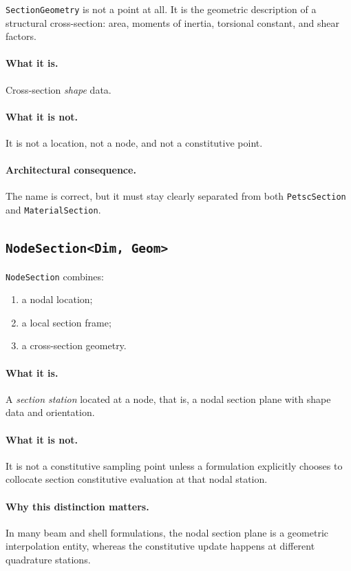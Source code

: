 \texttt{SectionGeometry} is not a point at all.  It is the geometric
description of a structural cross-section: area, moments of inertia, torsional
constant, and shear factors.

\paragraph{What it is.}
Cross-section \emph{shape} data.

\paragraph{What it is not.}
It is not a location, not a node, and not a constitutive point.

\paragraph{Architectural consequence.}
The name is correct, but it must stay clearly separated from both
\texttt{PetscSection} and \texttt{MaterialSection}.


\subsection{\texttt{NodeSection<Dim, Geom>}}

\texttt{NodeSection} combines:

\begin{enumerate}[nosep]
  \item a nodal location;
  \item a local section frame;
  \item a cross-section geometry.
\end{enumerate}

\paragraph{What it is.}
A \emph{section station} located at a node, that is, a nodal section plane with
shape data and orientation.

\paragraph{What it is not.}
It is not a constitutive sampling point unless a formulation explicitly chooses
to collocate section constitutive evaluation at that nodal station.

\paragraph{Why this distinction matters.}
In many beam and shell formulations, the nodal section plane is a geometric
interpolation entity, whereas the constitutive update happens at different
quadrature stations.


